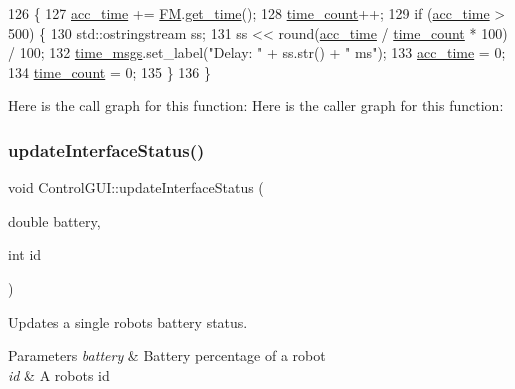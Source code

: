 \begin{DoxyCode}
126                                  \{
127     \hyperlink{class_control_g_u_i_ae156679755c9112ad987a96449413cbb}{acc\_time} += \hyperlink{class_control_g_u_i_a16612b604257a888faac7a1d7e9e3e51}{FM}.\hyperlink{class_flying_messenger_ac21061f46ad40fc1e352b6169ad4b62a}{get\_time}();
128     \hyperlink{class_control_g_u_i_a7cb0b94f14867e85d0f630fddf31d158}{time\_count}++;
129     \textcolor{keywordflow}{if} (\hyperlink{class_control_g_u_i_ae156679755c9112ad987a96449413cbb}{acc\_time} > 500) \{
130         std::ostringstream ss;
131         ss << round(\hyperlink{class_control_g_u_i_ae156679755c9112ad987a96449413cbb}{acc\_time} / \hyperlink{class_control_g_u_i_a7cb0b94f14867e85d0f630fddf31d158}{time\_count} * 100) / 100;
132         \hyperlink{class_control_g_u_i_a2816137ab08d4362af2418e73e1dcfb3}{time\_msgs}.set\_label(\textcolor{stringliteral}{"Delay: "} + ss.str() + \textcolor{stringliteral}{" ms"});
133         \hyperlink{class_control_g_u_i_ae156679755c9112ad987a96449413cbb}{acc\_time} = 0;
134         \hyperlink{class_control_g_u_i_a7cb0b94f14867e85d0f630fddf31d158}{time\_count} = 0;
135     \}
136 \}
\end{DoxyCode}
Here is the call graph for this function\+:
Here is the caller graph for this function\+:
\mbox{\label{class_control_g_u_i_a79310d7b529eb07bbc67f7873964914f}} 
\subsubsection{\texorpdfstring{update\+Interface\+Status()}{updateInterfaceStatus()}}
{\footnotesize\ttfamily void Control\+G\+U\+I\+::update\+Interface\+Status (\begin{DoxyParamCaption}\item[{double}]{battery,  }\item[{int}]{id }\end{DoxyParamCaption})}



Updates a single robot\textquotesingle{}s battery status. 


\begin{DoxyParams}{Parameters}
{\em battery} & Battery percentage of a robot \\
\hline
{\em id} & A robot\textquotesingle{}s id \\
\hline
\end{DoxyParams}


